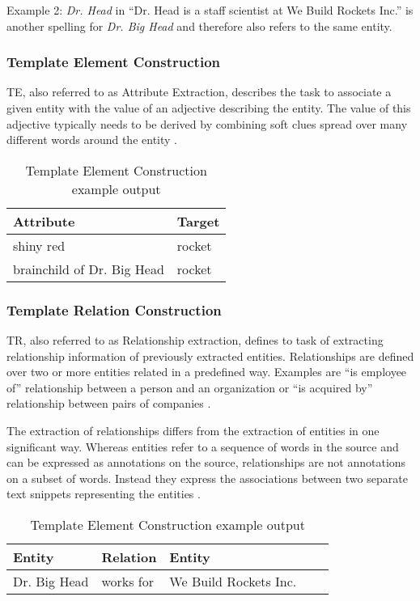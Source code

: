 Example 2: \textit{Dr. Head} in \enquote{Dr. Head is a staff scientist at We Build Rockets Inc.} is another spelling for \textit{Dr. Big Head} and therefore also refers to the same entity.

\subsubsection{Template Element Construction}
\gls{TE}, also referred to as Attribute Extraction, describes the task to associate a given entity with the value of an adjective describing the entity. The value of this adjective typically needs to be derived by combining soft clues spread over many different words around the entity
 \cite{Sarawagi:2008}.

\begin{table}[H]
\centering
\begin{tabular*}{\textwidth}{ l  l }
	\toprule
	\textbf{Attribute} & \textbf{Target} \\
	\midrule
	shiny red & rocket \\
	brainchild of Dr. Big Head & rocket \\
	\bottomrule
\end{tabular*}
\caption{Template Element Construction example output}
\end{table}

\subsubsection{Template Relation Construction}
\gls{TR}, also referred to as Relationship extraction, defines to task of extracting relationship information of previously extracted entities. Relationships are defined over two or more entities related in a predefined way. Examples are \enquote{is employee of} relationship between a person and an organization or \enquote{is acquired by} relationship between pairs of companies \cite{Sarawagi:2008}.

The extraction of relationships differs from the extraction of entities in one significant way. Whereas entities refer to a sequence of words in the source and can be expressed as annotations on the source, relationships are not annotations on a subset of words. Instead they express the associations between two separate text snippets representing the entities \cite{Sarawagi:2008}.

\begin{table}[H]
\centering
\begin{tabular*}{\textwidth}{ l l l l l }
	\toprule
	\textbf{Entity} & \textbf{Relation}  & \textbf{Entity} \\
	\midrule
	Dr. Big Head & works for & We Build Rockets Inc. \\
	\bottomrule
\end{tabular*}
\caption{Template Element Construction example output}
\end{table}

